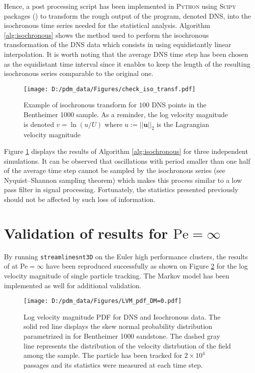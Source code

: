 Hence, a post processing script has been implemented in \textsc{Python} using \textsc{Scipy} packages (\cite{scipy}) to transform the rough output of the program, denoted DNS, into the isochronous time series needed for the statistical analysis.
Algorithm \ref{alg:isochronous} shows the method used to perform the isochronous transformation of the DNS data which consists in using equidistantly linear interpolation.
It is worth noting that the average DNS time step has been chosen as the equidistant time interval since it enables to keep the length of the resulting isochronous series comparable to the original one.\\
\begin{figure}
	\centering
	\texttt{[image: D:/pdm\_data/Figures/check\_iso\_transf.pdf]}
	\caption{Example of isochronous transform for $100$ DNS points in the Bentheimer 1000 sample. As a reminder, the log velocity magnitude is denoted $v=\ln{(u/U)}$ where $u:=||\textbf{u}||_2$ is the Lagrangian velocity magnitude}
	\label{fig:checkisotransf}
\end{figure}
Figure \ref{fig:checkisotransf} displays the results of Algorithm \ref{alg:isochronous} for three independent simulations.
It can be observed that oscillations with period smaller than one half of the average time step cannot be sampled by the isochronous series (see Nyquist–Shannon sampling theorem) which makes this process similar to a low pass filter in signal processing.
Fortunately, the statistics presented previously should not be affected by such loss of information.\\

\section{Validation of \cite{Meyer2016} results for $\mathrm{Pe}=\infty$}
By running \texttt{streamlinesnt3D} on the Euler high performance clusters, the results of \citet{Meyer2016} at Pe$=\infty$ have been reproduced successfully as shown on Figure \ref{fig:lvm_pdf_peinf} for the log velocity magnitude of single particle tracking. 
The Markov model has been implemented as well for additional validation.
\begin{figure}
	\centering
	\texttt{[image: D:/pdm\_data/Figures/LVM\_pdf\_DM=0.pdf]}
	\caption{Log velocity magnitude PDF for DNS and Isochronous data. The solid red line displays the skew normal probability distribution parametrized in \citet{Meyer2016} for Bentheimer 1000 sandstone. The dashed gray line represents the distribution of the velocity distrbution of the field among the sample. The particle has been tracked for $2\times 10^4$ passages and its statistics were measured at each time step.}
	\label{fig:lvm_pdf_peinf}
\end{figure}

